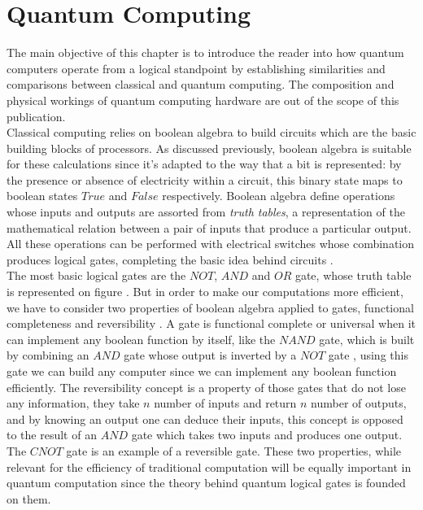 \documentclass[12pt,a4paper]{scrartcl}
\begin{document}
\section{Quantum Computing}

The main objective of this chapter is to introduce the reader into how quantum computers operate from a logical standpoint by establishing similarities and comparisons between classical and quantum computing. The composition and physical workings of quantum computing hardware are out of the scope of this publication.\\

Classical computing relies on boolean algebra to build circuits which are the basic building blocks of processors. As discussed previously, boolean algebra is suitable for these calculations since it's adapted to the way that a bit is represented: by the presence or absence of electricity within a circuit, this binary state maps to boolean states $True$ and $False$ respectively. Boolean algebra define operations whose inputs and outputs are assorted from \textit{truth tables}, a representation of the mathematical relation between a pair of inputs that produce a particular output. All these operations can be performed with electrical switches whose combination produces logical gates, completing the basic idea behind circuits \cite{bernhardt2019quantum}. \\

The most basic logical gates are the $NOT$, $AND$ and $OR$ gate, whose truth table is represented on figure \label{table:truthtablevarious}. But in order to make our computations more efficient, we have to consider two properties of boolean algebra applied to gates, functional completeness and reversibility \cite{bernhardt2019quantum}. A gate is functional complete or universal when it can implement any boolean function by itself, like the $NAND$ gate, which is built by combining an $AND$ gate whose output is inverted by a $NOT$ gate \cite{Bourdillon1985}, using this gate we can build any computer since we can implement any boolean function efficiently. The reversibility concept is a property of those gates that do not lose any information, they take $n$ number of inputs and return $n$ number of outputs, and by knowing an output one can deduce their inputs, this concept is opposed to the result of an $AND$ gate which takes two inputs and produces one output. The $CNOT$ gate is an example of a reversible gate. These two properties, while relevant for the efficiency of traditional computation will be equally important in quantum computation since the theory behind quantum logical gates is founded on them.\\
\end{document}
